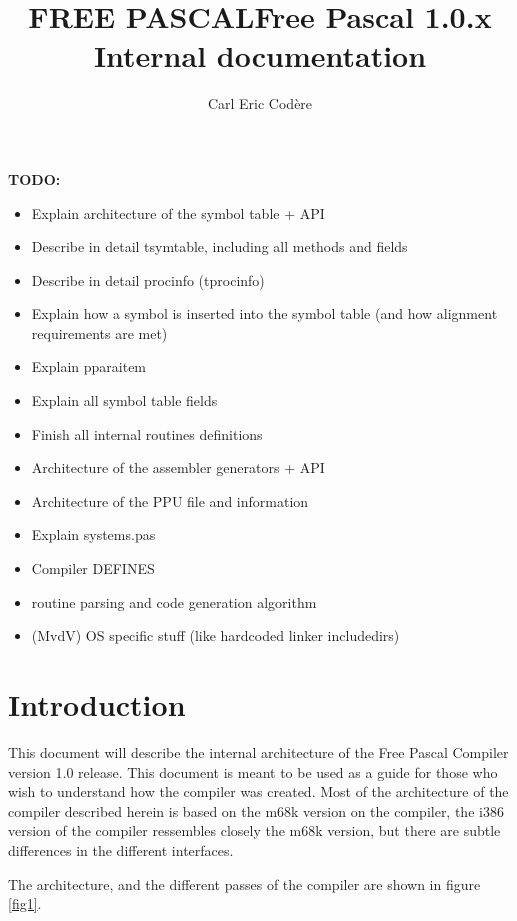 \documentclass [a4paper,12pt]{article}
\title{FREE PASCAL}
\title{Free Pascal 1.0.x Internal documentation}
\author{Carl Eric Cod\`{e}re}
\begin{document}
\maketitle
\tableofcontents
\newpage
\listoffigures
\newpage

\textbf{TODO:}
\begin{itemize}
\item Explain architecture of the symbol table + API
\item Describe in detail tsymtable, including all methods and fields
\item Describe in detail procinfo (tprocinfo)
\item Explain how a symbol is inserted into the symbol table (and how alignment requirements are met)
\item Explain pparaitem
\item Explain all symbol table fields
\item Finish all internal routines definitions
\item Architecture of the assembler generators + API
\item Architecture of the PPU file and information
\item Explain systems.pas
\item Compiler DEFINES
\item routine parsing and code generation algorithm
\item (MvdV) OS specific stuff (like hardcoded linker includedirs)
\end{itemize}

\section{Introduction}
\label{sec:introductionappendix}

This document will describe the internal architecture of the Free Pascal
Compiler version 1.0 release. This document is meant to be used as a guide
for those who wish to understand how the compiler was created. Most of the
architecture of the compiler described herein is based on the m68k version
on the compiler, the i386 version of the compiler ressembles closely the
m68k version, but there are subtle differences in the different interfaces.

The architecture, and the different passes of the compiler are shown in
figure \ref{fig1}.
\end{document}
